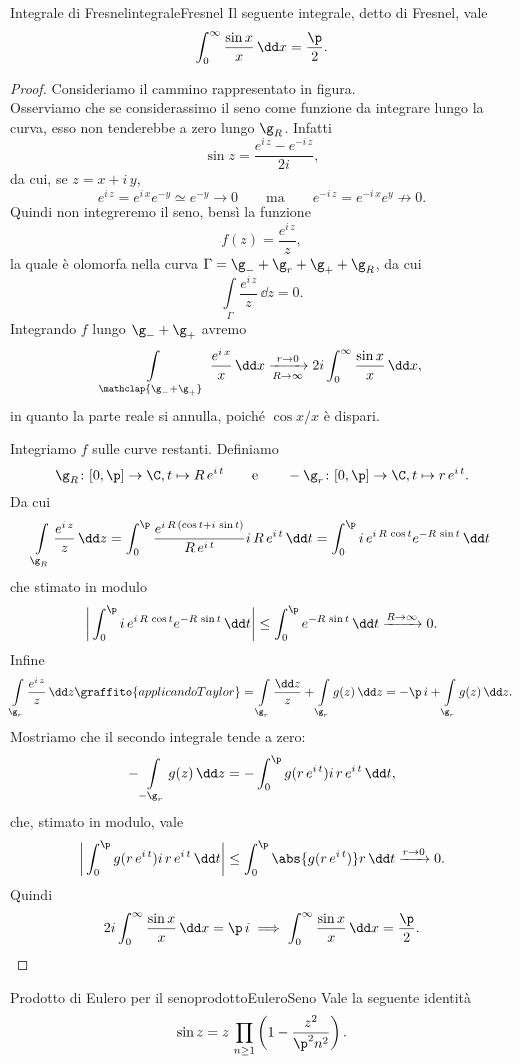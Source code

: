 \begin{prop}{Integrale di Fresnel}{integraleFresnel}
	Il seguente integrale, detto di Fresnel, vale
	\[
		\int_0^\infty \frac{\sin x}{x}\,\dd x = \frac{\p}{2}.
	\]
\end{prop}
\begin{proof}
	Consideriamo il cammino rappresentato in figura.
	\[
		
	\]
	Osserviamo che se considerassimo il seno come funzione da integrare lungo la curva, esso non tenderebbe a zero lungo \(\g_R\). Infatti
	\[
		\sin z = \frac{e^{i\,z}-e^{-i\,z}}{2i},
	\]
	da cui, se \(z=x+i\,y\),
	\[
		e^{i\,z} = e^{i\,x}e^{-y} \simeq e^{-y} \to 0 \qquad\text{ma}\qquad e^{-i\,z}=e^{-i\,x}e^y \not\to 0.
	\]
	Quindi non integreremo il seno, bensì la funzione
	\[
		f(z) = \frac{e^{i\,z}}{z},
	\]
	la quale è olomorfa nella curva \(\Gamma=\g_-+\g_r+\g_++\g_R\), da cui
	\[
		\int\limits_\Gamma \frac{e^{i\,z}}{z}\,\dd z = 0.
	\]
	Integrando \(f\) lungo \(\g_-+\g_+\) avremo
	\[
		\int\limits_{\mathclap{\g_-+\g_+}}\,\frac{e^{i\,x}}{x}\,\dd x \xrightarrow[R\to\infty]{r\to 0} 2i \int_0^\infty \frac{\sin x}{x}\,\dd x,
	\]
	in quanto la parte reale si annulla, poiché \(\cos x/x\) è dispari.

	Integriamo \(f\) sulle curve restanti. Definiamo
	\[
		\g_R\colon [0,\p] \to \C, t \mapsto R\,e^{i\,t} \qquad\text{e}\qquad -\g_r\colon [0,\p] \to \C, t \mapsto r\,e^{i\,t}.
	\]
	Da cui
	\[
		\int\limits_{\g_R} \frac{e^{i\,z}}{z}\,\dd z = \int_0^\p \frac{e^{i\,R\,(\cos t+i\,\sin t)}}{R\,e^{i\,t}}i\,R\,e^{i\,t}\,\dd t = \int_0^\p i\,e^{i\,R\,\cos t}e^{-R\,\sin t}\,\dd t
	\]
	che stimato in modulo
	\[
		\bigg\lvert \int_0^\p i\,e^{i\,R\,\cos t}e^{-R\,\sin t}\,\dd t \bigg\rvert \le \int_0^\p e^{-R\,\sin t}\,\dd t \xrightarrow{R\to \infty} 0.
	\]
	Infine
	\[
		\int\limits_{\g_r} \frac{e^{i\,z}}{z}\,\dd z \graffito{applicando Taylor} = \int\limits_{\g_r} \frac{\dd z}{z} + \int\limits_{\g_r} g(z)\,\dd z = -\p\,i + \int\limits_{\g_r} g(z)\,\dd z.
	\]
	Mostriamo che il secondo integrale tende a zero:
	\[
		-\int\limits_{-\g_r} g(z)\,\dd z = -\int_0^\p g(r\,e^{i\,t})i\,r\,e^{i\,t}\,\dd t,
	\]
	che, stimato in modulo, vale
	\[
		\bigg\lvert \int_0^\p g(r\,e^{i\,t})i\,r\,e^{i\,t}\,\dd t \bigg\rvert \le \int_0^\p \abs{g(r\,e^{i\,t})}r\,\dd t \xrightarrow{r\to 0} 0.
	\]
	Quindi
	\[
		2i \int_0^\infty \frac{\sin x}{x}\,\dd x = \p\,i \implies \int_0^\infty \frac{\sin x}{x}\,\dd x = \frac{\p}{2}.
	\]
\end{proof}

\begin{prop}{Prodotto di Eulero per il seno}{prodottoEuleroSeno}
	Vale la seguente identità
	\[
		\sin z = z\,\prod_{n\ge 1} \left( 1- \frac{z^2}{\p^2 n^2} \right).
	\]
\end{prop}

